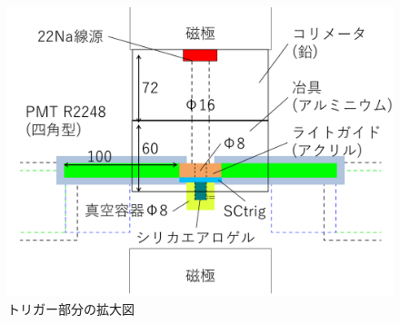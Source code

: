 \begin{figure}[H]
\centering
\includegraphics[keepaspectratio,scale=0.4]{fig/ybm/device4.pdf}
\caption{トリガー部分の拡大図}
\label{fig:device4}
\end{figure}

